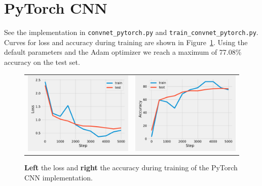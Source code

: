 \documentclass{article}
\newcommand\·{\ensuremath{\cdot}}
\newcommand\…{\ensuremath{\dots}}
\newcommand{\⇔}{\ensuremath{\iff}}
\newcommand{\⇐}{\ensuremath{\impliedby}}
\newcommand{\⇒}{\ensuremath{\implies}}
\newcommand\1{\ensuremath{\mathds{1}}}
\newcommand\ℝ{\ensuremath{\mathds{R}}}
\begin{document}
\section{PyTorch CNN}
See the implementation in \texttt{convnet\_pytorch.py} and  \texttt{train\_convnet\_pytorch.py}.
Curves for loss and accuracy during training are shown in Figure~\ref{fig:pytorch_conv}.
Using the default parameters and  the Adam optimizer we reach a maximum of 77.08\% accuracy on the test set.

\begin{figure}
  \begin{tabularx}{\linewidth}{XX}
    \includegraphics[width=\linewidth]{assignment_1/code/conv_loss.pdf} &
    \includegraphics[width=\linewidth]{assignment_1/code/conv_accuracy.pdf}
  \end{tabularx}
  \caption{\textbf{Left} the loss and \textbf{right} the accuracy during training of the PyTorch CNN implementation.}
  \label{fig:pytorch_conv}
\end{figure}
\end{document}
